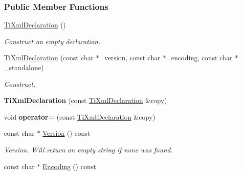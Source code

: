 \subsubsection*{Public Member Functions}
\begin{DoxyCompactItemize}
\item 
\hypertarget{class_ti_xml_declaration_aa0484d059bea0ea1acb47c9094382d79}{
\hyperlink{class_ti_xml_declaration_aa0484d059bea0ea1acb47c9094382d79}{TiXmlDeclaration} ()}
\label{class_ti_xml_declaration_aa0484d059bea0ea1acb47c9094382d79}

\begin{DoxyCompactList}\small\item\em Construct an empty declaration. \item\end{DoxyCompactList}\item 
\hypertarget{class_ti_xml_declaration_a3b618d1c30c25e4b7a71f31a595ee298}{
\hyperlink{class_ti_xml_declaration_a3b618d1c30c25e4b7a71f31a595ee298}{TiXmlDeclaration} (const char $\ast$\_\-version, const char $\ast$\_\-encoding, const char $\ast$\_\-standalone)}
\label{class_ti_xml_declaration_a3b618d1c30c25e4b7a71f31a595ee298}

\begin{DoxyCompactList}\small\item\em Construct. \item\end{DoxyCompactList}\item 
\hypertarget{class_ti_xml_declaration_a58ac9042c342f7845c8491da0bb091e8}{
{\bfseries TiXmlDeclaration} (const \hyperlink{class_ti_xml_declaration}{TiXmlDeclaration} \&copy)}
\label{class_ti_xml_declaration_a58ac9042c342f7845c8491da0bb091e8}

\item 
\hypertarget{class_ti_xml_declaration_a0fedc57539af9049be8db2d7d9d9ba33}{
void {\bfseries operator=} (const \hyperlink{class_ti_xml_declaration}{TiXmlDeclaration} \&copy)}
\label{class_ti_xml_declaration_a0fedc57539af9049be8db2d7d9d9ba33}

\item 
\hypertarget{class_ti_xml_declaration_a02ee557b1a4545c3219ed377c103ec76}{
const char $\ast$ \hyperlink{class_ti_xml_declaration_a02ee557b1a4545c3219ed377c103ec76}{Version} () const }
\label{class_ti_xml_declaration_a02ee557b1a4545c3219ed377c103ec76}

\begin{DoxyCompactList}\small\item\em Version. Will return an empty string if none was found. \item\end{DoxyCompactList}\item 
\hypertarget{class_ti_xml_declaration_a5d974231f9e9a2f0542f15f3a46cdb76}{
const char $\ast$ \hyperlink{class_ti_xml_declaration_a5d974231f9e9a2f0542f15f3a46cdb76}{Encoding} () const }
\label{class_ti_xml_declaration_a5d974231f9e9a2f0542f15f3a46cdb76}


\end{DoxyCompactItemize}
